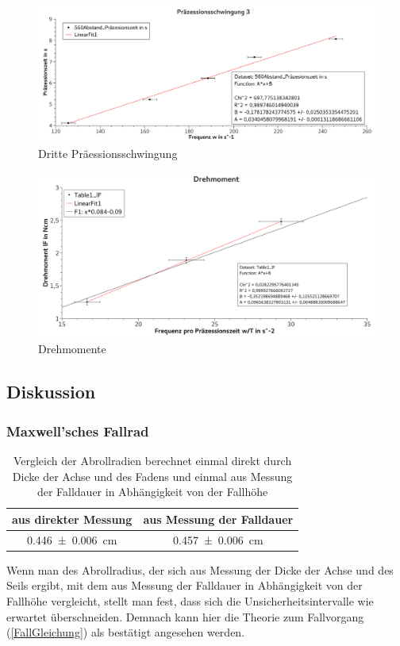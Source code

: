\documentclass[
	a4paper,
	12pt,
	pagesize,
	ngerman
]{scrartcl}
\begin{document}
	\begin{figure}[tb]
		\includegraphics[width=1\textwidth]{Praez3}
		\centering
		\caption{Dritte Präessionsschwingung}
		\label{Praez3}
		\centering
	\end{figure}

	\begin{figure}[tb]
		\includegraphics[width=1\textwidth]{Drehmoment}
		\centering
		\caption{Drehmomente} %
		\label{Drehmoment}
		\centering
	\end{figure}




	\subsection{Diskussion}
	\subsubsection{Maxwell'sches Fallrad}
	
	\begin{table}[tb]
		\centering
		\begin{tabular}{ c | c }
			aus direkter Messung & aus Messung der Falldauer\\ \hline
			\SI{0,446 \pm 0,006}{cm} & \SI{0,457 \pm 0,006}{cm} \\
		\end{tabular}
		\caption{Vergleich der Abrollradien berechnet einmal direkt durch Dicke der Achse und des Fadens und einmal aus Messung der Falldauer in Abhängigkeit von der Fallhöhe}
		\label{Abrollradius_Vergleich} 
	\end{table}
	Wenn man des Abrollradius, der sich aus Messung der Dicke der Achse und des Seils ergibt, mit dem aus Messung der Falldauer in Abhängigkeit von der Fallhöhe vergleicht, stellt man fest, dass sich die Unsicherheitsintervalle wie erwartet überschneiden.
	Demnach kann hier die Theorie zum Fallvorgang (\cref{FallGleichung}) als bestätigt angesehen werden.
	
\end{document}

